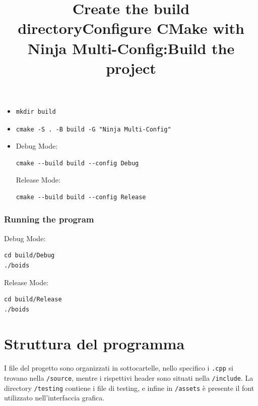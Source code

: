 \documentclass[10pt,a4paper]{article}
\begin{document}
\begin{itemize}
    \item \title{\textbf{Create the build directory}}

          \begin{lstlisting}[style=github-bash]
mkdir build
\end{lstlisting}

    \item \title{\textbf{Configure CMake with Ninja Multi-Config:}}

          \begin{lstlisting}[style=github-bash]
cmake -S . -B build -G "Ninja Multi-Config"
\end{lstlisting}

    \item \title{\textbf{Build the project}}

    Debug Mode:
          \begin{lstlisting}[style=github-bash]
cmake --build build --config Debug
\end{lstlisting}

Release Mode:
          \begin{lstlisting}[style=github-bash]
cmake --build build --config Release
\end{lstlisting}    
\end{itemize}


\subsubsection{Running the program}

    Debug Mode:
          \begin{lstlisting}[style=github-bash]
cd build/Debug
./boids
\end{lstlisting}

Release Mode:
          \begin{lstlisting}[style=github-bash]
cd build/Release
./boids
\end{lstlisting}    



\newpage

\parskip 6.4pt

\section{Struttura del programma}

I file del progetto sono organizzati in sottocartelle, nello specifico i \texttt{.cpp} si trovano nella \texttt{/source}, mentre i rispettivi header sono situati nella \texttt{/include}. La directory \texttt{/testing} contiene i file di testing, e infine in \texttt{/assets} è presente il font utilizzato nell'interfaccia grafica.
\end{document}
